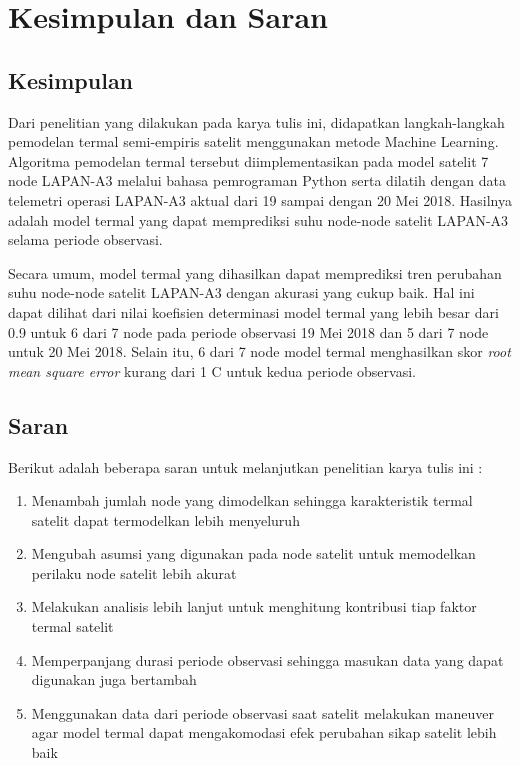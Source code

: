 \chapter{Kesimpulan dan Saran}

\section{Kesimpulan}

Dari penelitian yang dilakukan pada karya tulis ini, didapatkan langkah-langkah
pemodelan termal semi-empiris satelit menggunakan metode Machine Learning.
Algoritma pemodelan termal tersebut diimplementasikan pada model satelit 7 node
LAPAN-A3 melalui bahasa pemrograman Python serta dilatih dengan data telemetri
operasi LAPAN-A3 aktual dari 19 sampai dengan 20 Mei 2018. Hasilnya adalah model
termal yang dapat memprediksi suhu node-node satelit LAPAN-A3 selama periode
observasi.

Secara umum, model termal yang dihasilkan dapat memprediksi tren perubahan suhu
node-node satelit LAPAN-A3 dengan akurasi yang cukup baik. Hal ini dapat
dilihat dari nilai koefisien determinasi model termal yang lebih besar dari 0.9
untuk 6 dari 7 node pada periode observasi 19 Mei 2018 dan 5 dari 7 node untuk
20 Mei 2018. Selain itu, 6 dari 7 node model termal menghasilkan skor
\textit{root mean square error} kurang dari 1 \degree C untuk kedua periode observasi.

\section{Saran}

Berikut adalah beberapa saran untuk melanjutkan penelitian karya tulis ini :

\begin{enumerate}
\item Menambah jumlah node yang dimodelkan sehingga karakteristik termal satelit dapat termodelkan lebih menyeluruh
\item Mengubah asumsi yang digunakan pada node satelit untuk memodelkan perilaku node satelit lebih akurat
\item Melakukan analisis lebih lanjut untuk menghitung kontribusi tiap faktor termal satelit
\item Memperpanjang durasi periode observasi sehingga masukan data yang dapat digunakan juga bertambah
\item Menggunakan data dari periode observasi saat satelit melakukan maneuver agar model termal dapat mengakomodasi efek perubahan sikap satelit lebih baik
\end{enumerate}
